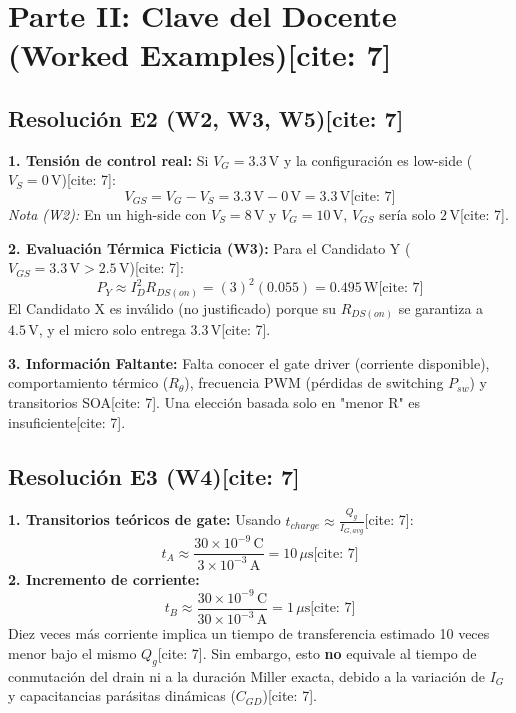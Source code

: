 \documentclass[11pt, a4paper]{article}
\begin{document}
\newpage
\section*{Parte II: Clave del Docente (Worked Examples)[cite: 7]}

\subsection*{Resolución E2 (W2, W3, W5)[cite: 7]}
\textbf{1. Tensión de control real:} Si $V_G = 3.3\,\text{V}$ y la configuración es low-side ($V_S = 0\,\text{V}$)[cite: 7]:
\begin{equation*}
    V_{GS} = V_G - V_S = 3.3\,\text{V} - 0\,\text{V} = 3.3\,\text{V} \text{[cite: 7]}
\end{equation*}
\textit{Nota (W2):} En un high-side con $V_S=8\,\text{V}$ y $V_G=10\,\text{V}$, $V_{GS}$ sería solo $2\,\text{V}$[cite: 7].

\textbf{2. Evaluación Térmica Ficticia (W3):} Para el Candidato Y ($V_{GS} = 3.3\,\text{V} > 2.5\,\text{V}$)[cite: 7]:
\begin{equation*}
    P_{Y} \approx I_D^2 R_{DS(on)} = (3)^2 (0.055) = 0.495\,\text{W} \text{[cite: 7]}
\end{equation*}
El Candidato X es inválido (no justificado) porque su $R_{DS(on)}$ se garantiza a $4.5\,\text{V}$, y el micro solo entrega $3.3\,\text{V}$[cite: 7].

\textbf{3. Información Faltante:} Falta conocer el gate driver (corriente disponible), comportamiento térmico ($R_{\theta}$), frecuencia PWM (pérdidas de switching $P_{sw}$) y transitorios SOA[cite: 7]. Una elección basada solo en "menor R" es insuficiente[cite: 7].

\subsection*{Resolución E3 (W4)[cite: 7]}
\textbf{1. Transitorios teóricos de gate:} Usando $t_{charge} \approx \frac{Q_g}{I_{G,avg}}$[cite: 7]:
\begin{equation*}
    t_A \approx \frac{30 \times 10^{-9}\,\text{C}}{3 \times 10^{-3}\,\text{A}} = 10\,\mu\text{s} \text{[cite: 7]}
\end{equation*}
\textbf{2. Incremento de corriente:}
\begin{equation*}
    t_B \approx \frac{30 \times 10^{-9}\,\text{C}}{30 \times 10^{-3}\,\text{A}} = 1\,\mu\text{s} \text{[cite: 7]}
\end{equation*}
Diez veces más corriente implica un tiempo de transferencia estimado 10 veces menor bajo el mismo $Q_g$[cite: 7]. Sin embargo, esto \textbf{no} equivale al tiempo de conmutación del drain ni a la duración Miller exacta, debido a la variación de $I_G$ y capacitancias parásitas dinámicas ($C_{GD}$)[cite: 7].
\end{document}
